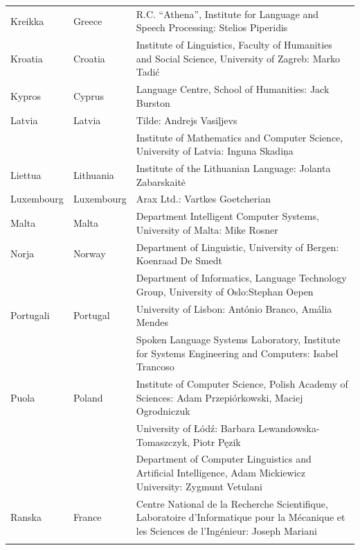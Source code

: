 \begin{longtable}{@{}llp{113mm}@{}}
Kreikka & \textcolor{grey1}{Greece} & R.C. “Athena”, Institute for Language and Speech Processing: Stelios Piperidis\\ \addlinespace
Kroatia & \textcolor{grey1}{Croatia} & Institute of Linguistics, Faculty of Humanities and Social Science, University of Zagreb: Marko Tadić \\ \addlinespace
Kypros & \textcolor{grey1}{Cyprus} & Language Centre, School of Humanities: Jack Burston\\ \addlinespace
Latvia & \textcolor{grey1}{Latvia} & Tilde: Andrejs Vasiļjevs\\ \addlinespace 
  & & Institute of Mathematics and Computer Science, University of Latvia: Inguna Skadiņa\\ \addlinespace
Liettua & \textcolor{grey1}{Lithuania} & Institute of the Lithuanian Language: Jolanta Zabarskaitė\\ \addlinespace
Luxembourg & \textcolor{grey1}{Luxembourg} & Arax Ltd.: Vartkes Goetcherian\\ \addlinespace
Malta & \textcolor{grey1}{Malta} & Department Intelligent Computer Systems, University of Malta: Mike Rosner\\ \addlinespace
Norja & \textcolor{grey1}{Norway} & Department of Linguistic, University of Bergen: Koenraad De Smedt\\ \addlinespace 
  & & Department of Informatics, Language Technology Group, University of Oslo:\newline Stephan Oepen \\ \addlinespace
Portugali & \textcolor{grey1}{Portugal} & University of Lisbon: António Branco, Amália Mendes \\ \addlinespace
  & & Spoken Language Systems Laboratory, Institute for Systems Engineering and Computers: Isabel Trancoso \\ \addlinespace
Puola & \textcolor{grey1}{Poland} & Institute of Computer Science, Polish Academy of Sciences: Adam Przepiórkowski, Maciej Ogrodniczuk \\ \addlinespace
  & & University of Łódź: Barbara Lewandowska-Tomaszczyk, Piotr Pęzik\\ \addlinespace
  & & Department of Computer Linguistics and Artificial Intelligence, Adam Mickiewicz University: Zygmunt Vetulani \\ \addlinespace
Ranska & \textcolor{grey1}{France} & Centre National de la Recherche Scientifique, Laboratoire d'Informatique pour la Mécanique et les Sciences de l'Ingénieur: Joseph Mariani \\ \addlinespace

\end{longtable}
